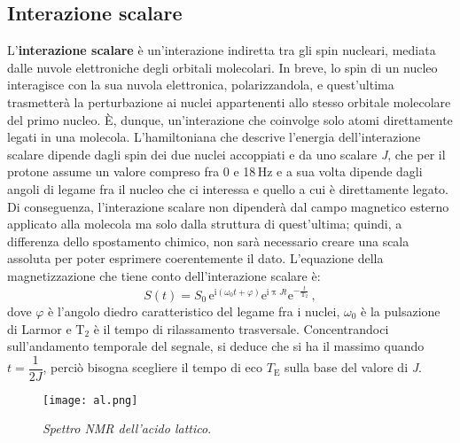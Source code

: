 \documentclass{report}
\numberwithin{equation}{section}
\numberwithin{figure}{section}
\begin{document}
\subsection{Interazione scalare}
L'\textbf{interazione scalare} è un'interazione indiretta tra gli spin nucleari, mediata dalle nuvole elettroniche degli orbitali molecolari. In breve, lo spin di un nucleo interagisce con la sua nuvola elettronica, polarizzandola, e quest'ultima trasmetterà la perturbazione ai nuclei appartenenti allo stesso orbitale molecolare del primo nucleo. È, dunque, un'interazione che coinvolge solo atomi direttamente legati in una molecola. L'hamiltoniana che descrive l'energia dell'interazione scalare dipende dagli spin dei due nuclei accoppiati e da uno scalare \textit{J}, che per il protone assume un valore compreso fra 0 e 18\,Hz e a sua volta dipende dagli angoli di legame fra il nucleo che ci interessa e quello a cui è direttamente legato. Di conseguenza, l'interazione scalare non dipenderà dal campo magnetico esterno applicato alla molecola ma solo dalla struttura di quest'ultima; quindi, a differenza dello spostamento chimico, non sarà necessario creare una scala assoluta per poter esprimere coerentemente il dato. L'equazione della magnetizzazione che tiene conto dell'interazione scalare è:
\begin{equation}
    S(t) = S_0\,\mathrm{e}^{\mathrm{i}(\omega_0t + \varphi)}\mathrm{e}^{\mathrm{i} \uppi Jt}\mathrm{e}^{-\frac{t}{\mathrm{T_2}}} \,,
    \label{3.6.3}
\end{equation}
dove $\varphi$ è l'angolo diedro caratteristico del legame fra i nuclei, $\omega_0$ è la pulsazione di Larmor e $\mathrm{T_2}$ è il tempo di rilassamento trasversale. Concentrandoci sull'andamento temporale del segnale, si deduce che si ha il massimo quando $t = \dfrac{1}{2J}$, perciò bisogna scegliere il tempo di eco $T_\mathrm{E}$ sulla base del valore di \textit{J}.

\begin{wrapfigure}{R}{0.495\textwidth}
    \centering
    \texttt{[image: al.png]}
    \caption{\textit{Spettro NMR dell'acido lattico}.}
    \label{fig:al}
\end{wrapfigure}
\end{document}
